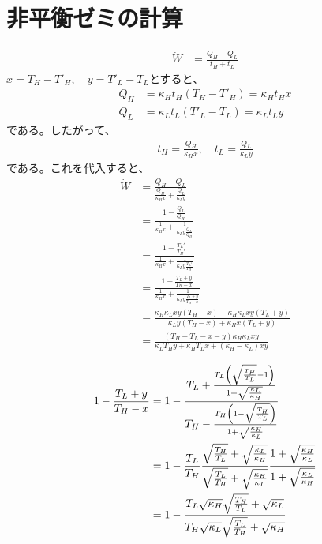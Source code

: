 \documentclass[a4paper,11pt]{jsarticle}
\numberwithin{equation}{section}
\begin{document}
\section{非平衡ゼミの計算}
\begin{align}
  \dot{W} &= \frac{Q_{H} - Q_{L}}{t_{H} + t_{L}}
\end{align}
$x = T_{H} - T'_{H},\quad y = T'_{L} - T_{L}$とすると、
\begin{align}
  Q_{H} &= \kappa_{H}t_{H}(T_{H}-T'_{H}) = \kappa_{H}t_{H}x\\
  Q_{L} &= \kappa_{L}t_{L}(T'_{L}-T_{L}) = \kappa_{L}t_{L}y
\end{align}
である。したがって、
\begin{align}
  t_{H} = \frac{Q_{H}}{\kappa_{H}x},\quad t_{L} = \frac{Q_{L}}{\kappa_{L}y}
\end{align}
である。これを代入すると、
\begin{align}
  \dot{W} &= \frac{Q_{H} - Q_{L}}{\frac{Q_{H}}{\kappa_{H}x} + \frac{Q_{L}}{\kappa_{L}y}}\\
  &= \frac{1-\frac{Q_{L}}{Q_{H}}}{\frac{1}{\kappa_{H}x} + \frac{1}{\kappa_{L}y\frac{Q_{L}}{Q_{H}}}}\\
  &= \frac{1-\frac{T_{L}'}{T_{H}'}}{\frac{1}{\kappa_{H}x} + \frac{1}{\kappa_{L}y\frac{T_{L}'}{T_{H}'}}}\\
  &= \frac{1-\frac{T_{L}+y}{T_{H}-x}}{\frac{1}{\kappa_{H}x} + \frac{1}{\kappa_{L}y\frac{T_{L}+y}{T_{H}-x}}}\\
  &= \frac{\kappa_{H}\kappa_{L}xy(T_{H}-x)-\kappa_{H}\kappa_{L}xy(T_{L}+y)}{\kappa_{L}y(T_{H}-x)+\kappa_{H}x(T_{L}+y)}\\
  &= \frac{(T_H + T_L - x - y)\kappa_H \kappa_L xy}{\kappa_L T_H y + \kappa_H T_L x + (\kappa_H - \kappa_L) xy}
\end{align}

\begin{align}
  1-\frac{T_{L}+y}{T_{H}-x} &= 1-\frac{T_L + \frac{T_{L}\qty(\sqrt{\frac{T_{H}}{T_{L}}}-1)}{1+\sqrt{\frac{\kappa_{L}}{\kappa_{H}}}}}{T_H - \frac{T_H\qty(1-\sqrt{\frac{T_{H}}{T_{L}}})}{1+\sqrt{\frac{\kappa_{H}}{\kappa_{L}}}}}\\
  &= 1-\frac{T_L}{T_H} \frac{\sqrt{\frac{T_H}{T_L}} + \sqrt{\frac{\kappa_{L}}{\kappa_{H}}}}{\sqrt{\frac{T_L}{T_H}} + \sqrt{\frac{\kappa_{H}}{\kappa_{L}}} } \frac{1 + \sqrt{\frac{\kappa_{H}}{\kappa_{L}}}}{1 + \sqrt{\frac{\kappa_{L}}{\kappa_{H}}}}\\
  &= 1 - \frac{T_L \sqrt{\kappa_H} \sqrt{\frac{T_H}{T_L}} + \sqrt{\kappa_L}}{T_H \sqrt{\kappa_L} \sqrt{\frac{T_L}{T_H}} + \sqrt{\kappa_H}}
\end{align}
\newpage
\end{document}
